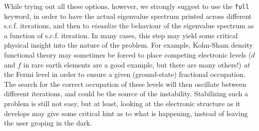 While trying out all these options, however, we strongly
suggest to use the  \texttt{full} keyword, in
order to have the actual eigenvalue spectrum printed across different
s.c.f. iterations, and then to \emph{visualize} the behaviour of the
eigenvalue spectrum as a function of s.c.f. iteration. In many cases,
this step may yield some critical physical insight into the nature of
the problem. For example, Kohn-Sham density functional theory may
sometimes be forced to place competing electronic levels ($d$ and $f$
in rare earth elements are a good example, but there are many others!)
\emph{at} the Fermi level in order to ensure a given (ground-state)
fractional occupation. The search for the correct occupation of these
levels will then oscillate between different iterations, and could be
the source of the instability. Stabilizing such a problem is still
not easy, but at least, looking at the electronic structure as it
develops may give some critical hint as to what is happening,
instead of leaving the user groping in the dark.
